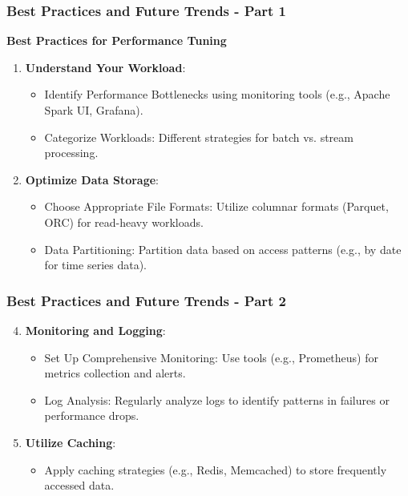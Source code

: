 \documentclass{beamer}
\begin{document}
\begin{frame}[fragile]
    \frametitle{Best Practices and Future Trends - Part 1}
    \textbf{Best Practices for Performance Tuning}
    
    \begin{enumerate}
        \item \textbf{Understand Your Workload}:
        \begin{itemize}
            \item Identify Performance Bottlenecks using monitoring tools (e.g., Apache Spark UI, Grafana).
            \item Categorize Workloads: Different strategies for batch vs. stream processing.
        \end{itemize}
        
        \item \textbf{Optimize Data Storage}:
        \begin{itemize}
            \item Choose Appropriate File Formats: Utilize columnar formats (Parquet, ORC) for read-heavy workloads.
            \item Data Partitioning: Partition data based on access patterns (e.g., by date for time series data).
        \end{itemize}
    \end{enumerate}
\end{frame}

\begin{frame}[fragile]
    \frametitle{Best Practices and Future Trends - Part 2}
    \begin{enumerate}
        \setcounter{enumi}{3}
        \item \textbf{Monitoring and Logging}:
        \begin{itemize}
            \item Set Up Comprehensive Monitoring: Use tools (e.g., Prometheus) for metrics collection and alerts.
            \item Log Analysis: Regularly analyze logs to identify patterns in failures or performance drops.
        \end{itemize}

        \item \textbf{Utilize Caching}:
        \begin{itemize}
            \item Apply caching strategies (e.g., Redis, Memcached) to store frequently accessed data.
        \end{itemize}
    \end{enumerate}
\end{frame}
\end{document}

